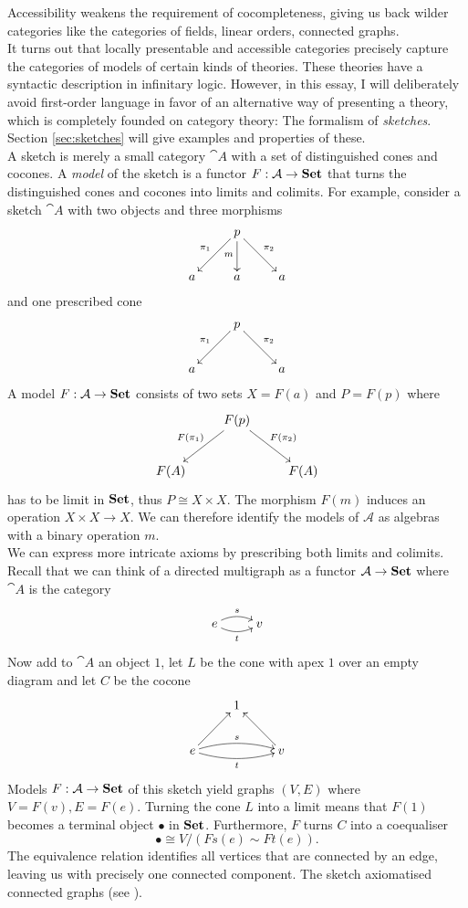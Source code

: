 Accessibility weakens the requirement of cocompleteness, giving us back wilder categories like the categories of fields, linear orders, connected graphs. \\

It turns out that locally presentable and accessible categories precisely capture the categories of models of certain kinds of theories. These theories have a syntactic description in infinitary logic. However, in this essay, I will deliberately avoid first-order language in favor of an alternative way of presenting a theory, which is completely founded on category theory: The formalism of \emph{sketches}. Section \ref{sec:sketches} will give examples and properties of these. \\

A sketch is merely a small category $\cat A$ with a set of distinguished cones and cocones. A \emph{model} of the sketch is a functor $F : \mathcal{A} \to \mathbf{Set}$ that turns the distinguished cones and cocones into limits and colimits. For example, consider a sketch $\cat A$ with two objects and three morphisms
\[
\xymatrix{
  & p \ar[rd]^{\pi_2} \ar[d]_{m} \ar[ld]_{\pi_1} & \\
a & a & a
}\]
and one prescribed cone
\[
\xymatrix{
  & p \ar[rd]^{\pi_2} \ar[ld]_{\pi_1} & \\
a & & a
}\]
A model $F : \mathcal{A} \to \mathbf{Set}$ consists of two sets $X=F(a)$ and $P=F(p)$ where
\[
\xymatrix{
  & F(p) \ar[rd]^{F(\pi_2)} \ar[ld]_{F(\pi_1)} & \\
F(A) & & F(A)
}\]
has to be limit in $\mathbf{Set}$, thus $P \cong X \times X$. The morphism $F(m)$ induces an operation $X \times X \to X$. We can therefore identify the models of $\mathcal A$ as algebras with a binary operation $m$. \\

We can express more intricate axioms by prescribing both limits and colimits. Recall that we can think of a directed multigraph as a functor $\mathcal{A} \to \mathbf{Set}$ where $\cat A$ is the category
\[
\xymatrix{
e \ar@/^/[r]^{s} \ar@/_/[r]_{t} & v
}\]
Now add to $\cat A$ an object $1$, let $L$ be the cone with apex $1$ over an empty diagram and let $C$ be the cocone \[
\xymatrix{
& 1 \\
e \ar@/^/[rr]^{s} \ar@/_/[rr]_{t} \ar[ru] & & v \ar[lu] \\
}\]
Models $F: \mathcal{A} \to \mathbf{Set}$ of this sketch yield graphs $(V,E)$ where $V=F(v),E=F(e)$. Turning the cone $L$ into a limit means that $F(1)$ becomes a terminal object $\bullet$ in $\mathbf{Set}$. Furthermore, $F$ turns $C$ into a coequaliser
\[ \bullet \cong V/(Fs(e)\sim Ft(e)). \]
The equivalence relation identifies all vertices that are connected by an edge, leaving us with precisely one connected component. The sketch axiomatised connected graphs (see \cite[Example D2.1.4]{elephant}). \\

